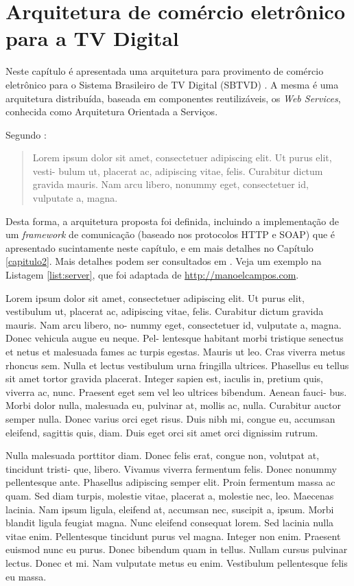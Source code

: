 \chapter{Arquitetura de comércio eletrônico para a TV Digital} \label{capitulo1}

Neste capítulo é apresentada uma arquitetura para provimento de comércio eletrônico
para o Sistema Brasileiro de TV Digital (SBTVD) . A mesma é uma arquitetura distribuída, baseada em componentes
reutilizáveis, os \textit{Web Services}, conhecida como Arquitetura Orientada a Serviços.

Segundo \cite{soares2007ginga}:

\begin{quote}
	Lorem ipsum dolor sit amet, consectetuer adipiscing elit. Ut purus elit, vesti- bulum ut, placerat ac, adipiscing vitae, felis. Curabitur dictum gravida mauris. Nam arcu libero, nonummy eget, consectetuer id, vulputate a, magna. 
\end{quote}

Desta forma, a arquitetura proposta foi definida, incluindo a implementação de um \textit{framework} de comunicação (baseado nos protocolos HTTP e SOAP) que é apresentado sucintamente neste capítulo, e em mais detalhes no Capítulo \ref{capitulo2}. Mais detalhes podem ser consultados em \cite{soares2007ginga}. Veja um exemplo na Listagem \ref{list:server}, que foi adaptada de \url{http://manoelcampos.com}.

Lorem ipsum dolor sit amet, consectetuer adipiscing elit. Ut purus elit, vestibulum ut, placerat ac, adipiscing vitae, felis. Curabitur dictum gravida mauris. Nam arcu libero, no- nummy eget, consectetuer id, vulputate a, magna. Donec vehicula augue eu neque. Pel- lentesque habitant morbi tristique senectus et netus et malesuada fames ac turpis egestas. Mauris ut leo. Cras viverra metus rhoncus sem. Nulla et lectus vestibulum urna fringilla ultrices. Phasellus eu tellus sit amet tortor gravida placerat. Integer sapien est, iaculis in, pretium quis, viverra ac, nunc. Praesent eget sem vel leo ultrices bibendum. Aenean fauci- bus. Morbi dolor nulla, malesuada eu, pulvinar at, mollis ac, nulla. Curabitur auctor semper nulla. Donec varius orci eget risus. Duis nibh mi, congue eu, accumsan eleifend, sagittis quis, diam. Duis eget orci sit amet orci dignissim rutrum.

Nulla malesuada porttitor diam. Donec felis erat, congue non, volutpat at, tincidunt tristi- que, libero. Vivamus viverra fermentum felis. Donec nonummy pellentesque ante. Phasellus adipiscing semper elit. Proin fermentum massa ac quam. Sed diam turpis, molestie vitae, placerat a, molestie nec, leo. Maecenas lacinia. Nam ipsum ligula, eleifend at, accumsan nec, suscipit a, ipsum. Morbi blandit ligula feugiat magna. Nunc eleifend consequat lorem. Sed lacinia nulla vitae enim. Pellentesque tincidunt purus vel magna. Integer non enim. Praesent euismod nunc eu purus. Donec bibendum quam in tellus. Nullam cursus pulvinar lectus. Donec et mi. Nam vulputate metus eu enim. Vestibulum pellentesque felis eu massa. 


